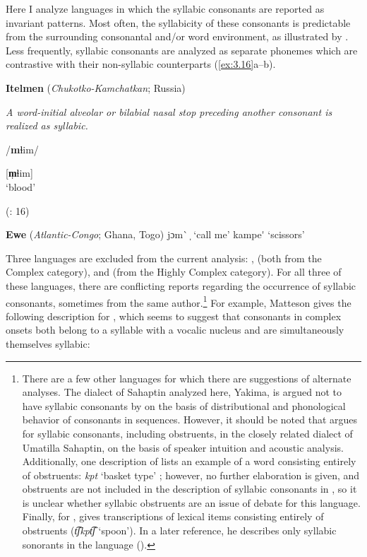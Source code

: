   Here I analyze languages in which the syllabic consonants are reported as invariant patterns. Most often, the syllabicity of these consonants is predictable from the surrounding consonantal and/or word environment, as illustrated by . Less frequently, syllabic consonants are analyzed as separate phonemes which are contrastive with their non-syllabic counterparts (\ref{ex:3.16}a--b).

\ea\label{ex:3.15}
  \textbf{Itelmen} (\textit{Chukotko-Kamchatkan}; Russia)

\textit{A word-initial alveolar or bilabial nasal stop preceding another consonant is realized as syllabic.}

/\textbf{m}ɬim/

[\textbf{m̩}ɬim]\\
\glt ‘blood’

(\citealt{GeorgVolodin1999}: 16)
\z

\ea\label{ex:3.16}
  \textbf{Ewe} (\textit{Atlantic-Congo}; Ghana, Togo)
\ea   jɔm\`{} ̩
\glt  ‘call me’
\ex kampe\'{} 
\glt  ‘scissors’
\citep[38]{Ameka1991}
\z
\z

  Three languages are excluded from the current analysis: ,  (both from the Complex category), and  (from the Highly Complex category). For all three of these languages, there are conflicting reports regarding the occurrence of syllabic consonants, sometimes from the same author.\footnote{{There are a few other languages for which there are suggestions of alternate analyses. The dialect of Sahaptin analyzed here, Yakima, is argued not to have syllabic consonants by \citet{HargusBeavert2006} on the basis of distributional and phonological behavior of consonants in sequences. However, it should be noted that \citet{Minthorn2005} argues for syllabic consonants, including obstruents, in the closely related dialect of Umatilla Sahaptin, on the basis of speaker intuition and acoustic analysis. Additionally, one description of  lists an example of a word consisting entirely of obstruents:} \textrm{\textit{kpt}} \textrm{‘basket type’ \citep[1]{EdmistonEdmiston2003}; however, no further elaboration is given, and obstruents are not included in the description of syllabic consonants in \citet{Bruce1984}, so it is unclear whether syllabic obstruents are an issue of debate for this language. Finally, for , \citet[42]{Volodin1976} gives transcriptions of lexical items consisting entirely of obstruents (}\textrm{\textit{t͡ʃkpt͡ʃ} }\textrm{‘spoon’). In a later reference, he describes only syllabic sonorants in the language (\citealt{GeorgVolodin1999}).}} For example, Matteson gives the following description for , which seems to suggest that consonants in complex onsets both belong to a syllable with a vocalic nucleus and are simultaneously themselves syllabic:

